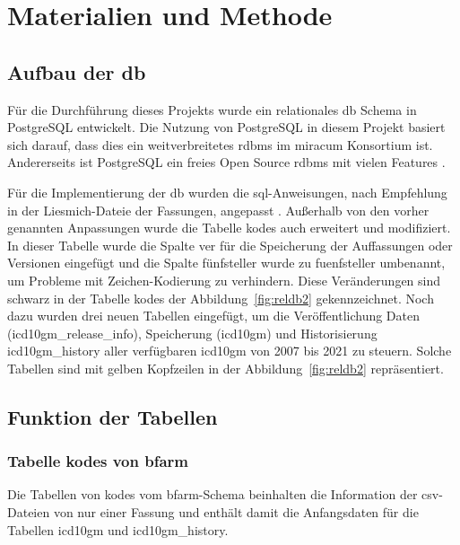 \chapter{Materialien und Methode} \label{ch:database}

\section{Aufbau der \acs{db}} \label{sec:dbdevelop}

Für die Durchführung dieses Projekts wurde ein relationales \ac{db} Schema in PostgreSQL entwickelt. Die Nutzung von PostgreSQL in diesem Projekt basiert sich darauf, dass dies ein weitverbreitetes \ac{rdbms} im \ac{miracum} Konsortium ist. Andererseits ist PostgreSQL ein freies Open Source \ac{rdbms} mit vielen Features \cite{postgres}.

Für die Implementierung der \ac{db} wurden die \ac{sql}-Anweisungen, nach Empfehlung in der Liesmich-Dateie der Fassungen, angepasst \cite{readmel}. Außerhalb von den vorher genannten Anpassungen wurde die Tabelle \glqq\textsf{kodes}\grqq{} auch erweitert und modifiziert. In dieser Tabelle wurde die Spalte \glqq\textsf{ver}\grqq{} für die Speicherung der Auffassungen oder Versionen eingefügt und die Spalte \glqq\textsf{fünfsteller}\grqq{} wurde zu \glqq\textsf{fuenfsteller}\grqq{} umbenannt, um Probleme mit Zeichen-Kodierung zu verhindern. Diese Veränderungen sind schwarz in der Tabelle \glqq\textsf{kodes}\grqq{} der Abbildung~\ref{fig:reldb2} gekennzeichnet. Noch dazu wurden drei neuen Tabellen eingefügt, um die Veröffentlichung Daten (\glqq\textsf{icd10gm\_release\_info}\grqq{}), Speicherung (\glqq\textsf{icd10gm}\grqq{}) und Historisierung \glqq\textsf{icd10gm\_history}\grqq{} aller verfügbaren \ac{icd10gm} von 2007 bis 2021 zu steuern. Solche Tabellen sind mit gelben Kopfzeilen in der Abbildung~\ref{fig:reldb2} repräsentiert.

\section{Funktion der Tabellen} \label{sec:functab}

\subsection{Tabelle \glqq\textsf{kodes}\grqq{} von \acs{bfarm}} \label{subsec:bfarmtables}

Die Tabellen von \glqq\textsf{kodes}\grqq{} vom \ac{bfarm}-Schema beinhalten die Information der \ac{csv}-Dateien von nur einer Fassung und enthält damit die Anfangsdaten für die Tabellen \glqq\textsf{icd10gm}\grqq{} und \glqq\textsf{icd10gm\_history}\grqq{}.

